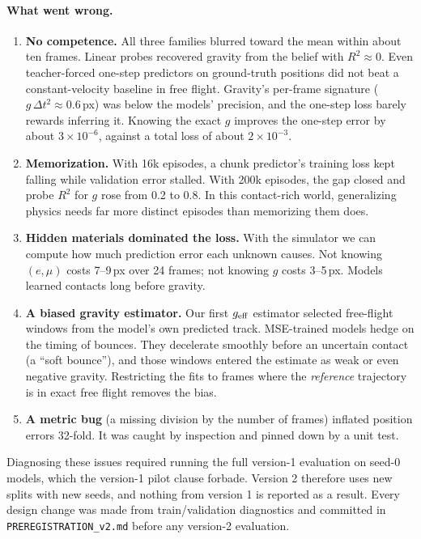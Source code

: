 \paragraph{What went wrong.}
\begin{enumerate}
\item \textbf{No competence.} All three families blurred toward the mean within about ten frames.
Linear probes recovered gravity from the belief with $R^2\approx0$. Even teacher-forced
one-step predictors on ground-truth positions did not beat a constant-velocity baseline in free
flight. Gravity's per-frame signature ($g\,\Delta t^2\approx0.6$\,px) was below the models'
precision, and the one-step loss barely rewards inferring it. Knowing the exact $g$ improves the
one-step error by about $3\times10^{-6}$, against a total loss of about $2\times10^{-3}$.
\item \textbf{Memorization.} With 16k episodes, a chunk predictor's training loss kept falling
while validation error stalled. With 200k episodes, the gap closed and probe $R^2$ for $g$ rose
from 0.2 to 0.8. In this contact-rich world, generalizing physics needs far more distinct episodes
than memorizing them does.
\item \textbf{Hidden materials dominated the loss.} With the simulator we can compute how much
prediction error each unknown causes. Not knowing $(e,\mu)$ costs 7--9\,px over 24 frames; not
knowing $g$ costs 3--5\,px. Models learned contacts long before gravity.
\item \textbf{A biased gravity estimator.} Our first $g_{\rm eff}$ estimator selected free-flight
windows from the model's own predicted track. MSE-trained models hedge on the timing of bounces.
They decelerate smoothly before an uncertain contact (a ``soft bounce''), and those windows
entered the estimate as weak or even negative gravity. Restricting the fits to frames where the
\emph{reference} trajectory is in exact free flight removes the bias.
\item \textbf{A metric bug} (a missing division by the number of frames) inflated position errors
32-fold. It was caught by inspection and pinned down by a unit test.
\end{enumerate}

Diagnosing these issues required running the full version-1 evaluation on seed-0 models, which the
version-1 pilot clause forbade. Version 2 therefore uses new splits with new seeds, and nothing from
version 1 is reported as a result. Every design change was made from train/validation diagnostics
and committed in \texttt{PREREGISTRATION\_v2.md} before any version-2 evaluation.
